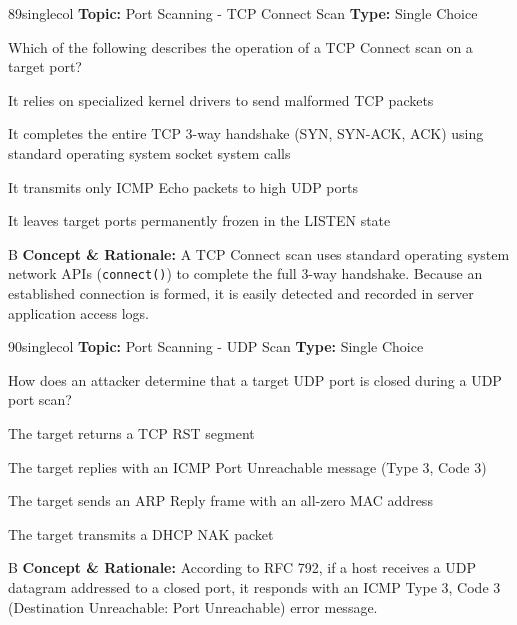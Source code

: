 \begin{qcard}{89}{singlecol}
\textcolor{darkslate!75}{\small\textbf{Topic:} Port Scanning - TCP Connect Scan \hfill \textbf{Type:} Single Choice}\vspace{0.4em}\par
Which of the following describes the operation of a TCP Connect scan on a target port?
\begin{qoptions}
\item It relies on specialized kernel drivers to send malformed TCP packets
\item It completes the entire TCP 3-way handshake (SYN, SYN-ACK, ACK) using standard operating system socket system calls
\item It transmits only ICMP Echo packets to high UDP ports
\item It leaves target ports permanently frozen in the LISTEN state
\end{qoptions}
\end{qcard}
\nopagebreak
\begin{explainbox}{B}
\textbf{Concept \& Rationale:} A TCP Connect scan uses standard operating system network APIs (\texttt{connect()}) to complete the full 3-way handshake. Because an established connection is formed, it is easily detected and recorded in server application access logs.
\end{explainbox}

\begin{qcard}{90}{singlecol}
\textcolor{darkslate!75}{\small\textbf{Topic:} Port Scanning - UDP Scan \hfill \textbf{Type:} Single Choice}\vspace{0.4em}\par
How does an attacker determine that a target UDP port is closed during a UDP port scan?
\begin{qoptions}
\item The target returns a TCP RST segment
\item The target replies with an ICMP Port Unreachable message (Type 3, Code 3)
\item The target sends an ARP Reply frame with an all-zero MAC address
\item The target transmits a DHCP NAK packet
\end{qoptions}
\end{qcard}
\nopagebreak
\begin{explainbox}{B}
\textbf{Concept \& Rationale:} According to RFC 792, if a host receives a UDP datagram addressed to a closed port, it responds with an ICMP Type 3, Code 3 (Destination Unreachable: Port Unreachable) error message.
\end{explainbox}

